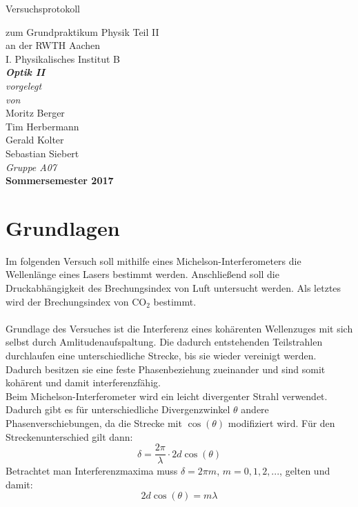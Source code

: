 \documentclass[12pt,a4paper]{article}
\author{Tim}
\begin{document}
\setlength{\parindent}{0pt} 
\begin{center}
{\LARGE Versuchsprotokoll}\\
\begin{large}
zum Grundpraktikum Physik Teil II\\[0.4cm]
an der RWTH Aachen\\
I. Physikalisches Institut B\\[4.5cm]
\Large\textbf{\textsl{Optik II}}\\[4cm]
\normalsize\textit{vorgelegt\\von}\\[0.4cm]
\large{Moritz Berger\\Tim Herbermann\\Gerald Kolter\\Sebastian Siebert}\\[1cm]
\large \textit{Gruppe A07} \\ [3cm]
\large \textbf{Sommersemester 2017}
\end{large}
\end{center}
\newpage

\tableofcontents
\newpage

\section{Grundlagen}

Im folgenden Versuch soll mithilfe eines Michelson-Interferometers die Wellenlänge eines Lasers bestimmt werden. Anschließend soll die Druckabhängigkeit des Brechungsindex von Luft untersucht werden. Als letztes wird der Brechungsindex von $\text{CO}_2$ bestimmt.\\
\\
Grundlage des Versuches ist  die Interferenz eines kohärenten Wellenzuges mit sich selbst durch Amlitudenaufspaltung. Die dadurch entstehenden Teilstrahlen durchlaufen eine unterschiedliche Strecke, bis sie wieder vereinigt werden. Dadurch besitzen sie eine feste Phasenbeziehung zueinander und sind somit kohärent und damit interferenzfähig.\\
Beim Michelson-Interferometer wird ein leicht divergenter Strahl verwendet. Dadurch gibt es für unterschiedliche Divergenzwinkel $\theta$ andere Phasenverschiebungen, da die Strecke mit $\cos(\theta)$ modifiziert wird. Für den Streckenunterschied gilt dann:
\begin{equation}
\delta = \dfrac{2\pi}{\lambda} \cdot 2d \cos(\theta)
\end{equation}
Betrachtet man Interferenzmaxima muss $\delta = 2\pi m$, $m=0,1,2,...$, gelten und damit:
\begin{equation}
2d \cos(\theta) = m\lambda
\label{equ:Maxima}
\end{equation}
\end{document}
